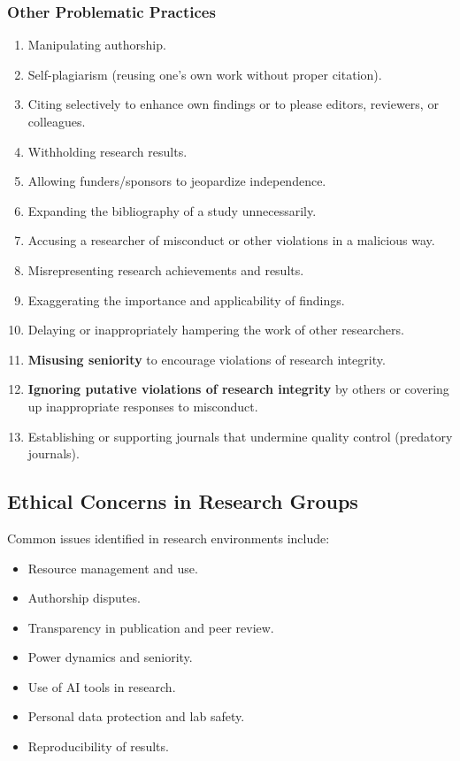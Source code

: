 \documentclass{article}
\begin{document}
\subsubsection{Other Problematic Practices}
\begin{enumerate}
    \item Manipulating authorship.
    \item Self-plagiarism (reusing one's own work without proper citation).
    \item Citing selectively to enhance own findings or to please editors, reviewers, or colleagues.
    \item Withholding research results.
    \item Allowing funders/sponsors to jeopardize independence.
    \item Expanding the bibliography of a study unnecessarily.
    \item Accusing a researcher of misconduct or other violations in a malicious way.
    \item Misrepresenting research achievements and results.
    \item Exaggerating the importance and applicability of findings.
    \item Delaying or inappropriately hampering the work of other researchers.
    \item \textbf{Misusing seniority} to encourage violations of research integrity.
    \item \textbf{Ignoring putative violations of research integrity} by others or covering up inappropriate responses to misconduct.
    \item Establishing or supporting journals that undermine quality control (predatory journals).
\end{enumerate}

\subsection{Ethical Concerns in Research Groups}\label{sec:group_concerns}
Common issues identified in research environments include:
\begin{itemize}
    \item Resource management and use.
    \item Authorship disputes.
    \item Transparency in publication and peer review.
    \item Power dynamics and seniority.
    \item Use of AI tools in research.
    \item Personal data protection and lab safety.
    \item Reproducibility of results.
\end{itemize}
\end{document}
